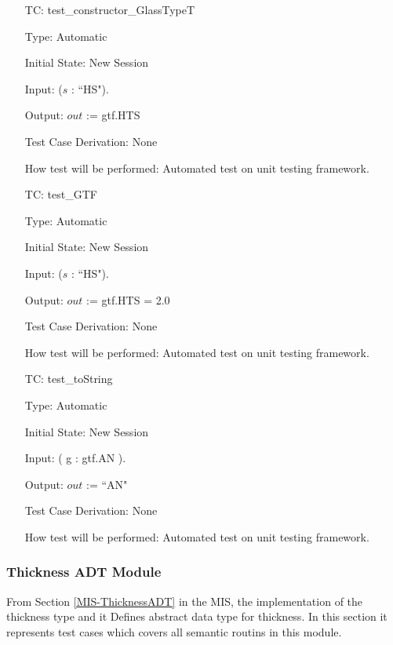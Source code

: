 \documentclass[12pt]{article}
\newcounter{utestnum} %
\begin{document}
\begin{enumerate}[label=TC\arabic*:,ref={\arabic*}]
	
	\item [TC\refstepcounter{utestnum}\theutestnum: \label{ConstructorGlassTypeTTest}] 
	test\_constructor\_GlassTypeT
	
	Type: Automatic
	
	Initial State: New Session
	
	Input: ($s$ : ``HS").
	
	Output: $out$ := gtf.HTS
	
	Test Case Derivation: None
	
	How test will be performed: Automated test on unit testing framework.
	
	\item [TC\refstepcounter{utestnum}\theutestnum: \label{GTFTest}] 
	test\_GTF
	
	Type: Automatic
	
	Initial State: New Session
	
	Input: ($s$ : ``HS").
	
	Output: $out$ := gtf.HTS = 2.0
	
	Test Case Derivation: None
	
	How test will be performed: Automated test on unit testing framework.
	
	\item [TC\refstepcounter{utestnum}\theutestnum: \label{GlassTypeToStringTest}] 
	test\_toString
	
	Type: Automatic
	
	Initial State: New Session
	
	Input: ( g : gtf.AN ).
	
	Output: $out$ := ``AN"
	
	Test Case Derivation: None
	
	How test will be performed: Automated test on unit testing framework.
	
	
	
\end{enumerate}



\subsubsection{Thickness ADT Module}	
From Section \ref{MIS-ThicknessADT} in the MIS, the implementation of the thickness type and it Defines abstract data type for thickness. In this section it represents test cases which covers all semantic routins in this module.
\end{document}
